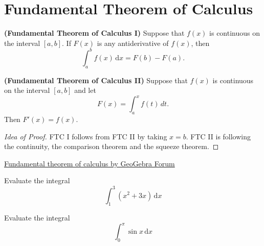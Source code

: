 
\hypertarget{fundamental-theorem-of-calculus}{%
\section{Fundamental Theorem of
Calculus}\label{fundamental-theorem-of-calculus}}

\begin{theorem}

\textbf{(Fundamental Theorem of Calculus I)} Suppose that \(f(x)\) is
continuous on the interval \([a,b]\). If \(F(x)\) is any antiderivative
of \(f(x)\), then \[\int_a^b f(x)\,\mathrm{d}x = F(b)-F(a).\]

\end{theorem}

\begin{theorem}

\textbf{(Fundamental Theorem of Calculus II)} Suppose that \(f(x)\) is
continuous on the interval \([a,b]\) and let \[F(x)=\int_a^x f(t)\,dt.\]
Then \(F'(x)=f(x)\).

\end{theorem}

\begin{proof}[Idea of Proof] FTC I follows from FTC II by taking \(x=b\). FTC
II is following the continuity, the comparison theorem and the squeeze
theorem.
\end{proof}

\href{https://www.geogebra.org/m/wdUED3wy}{Fundamental theorem of calculus by GeoGebra Forum}



\begin{example}

Evaluate the integral \[ \int_1^3 (x^2+3x)\,\mathrm{d}x\]

\end{example}
\vspace*{6\baselineskip}

\begin{example}

Evaluate the integral \[ \int_0^\pi \sin x \,\mathrm{d}x\]

\end{example}
\vspace*{6\baselineskip}

